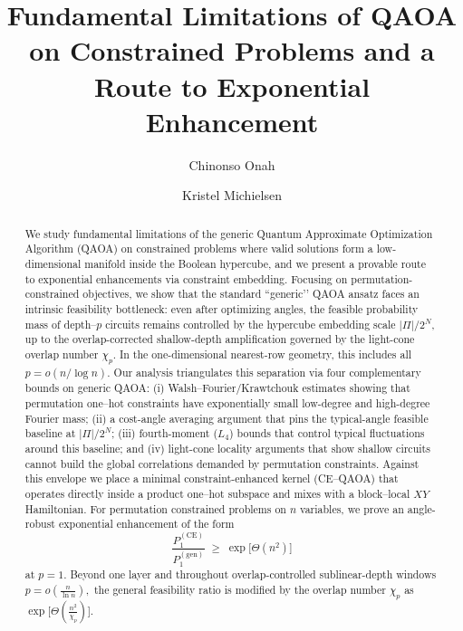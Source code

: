 \documentclass[a4paper,onecolumn,11pt,unpublished]{quantumarticle}
\author{Chinonso Onah}
\affiliation{Volkswagen AG, Berliner Ring 2, 38440 Wolfsburg, Germany}
\affiliation{Department of Physics, RWTH Aachen University, 52056 Aachen, Germany}
\author{Kristel Michielsen}
\affiliation{Forschungszentrum Jülich, Germany}
\affiliation{Universit\"at zu K\"oln, 50923 K\"oln, Germany}
\title{Fundamental Limitations of QAOA on Constrained Problems and a Route  to Exponential Enhancement}
\theoremstyle{remark}
\begin{document}
\maketitle




\begin{abstract}
We study fundamental limitations of the generic Quantum Approximate Optimization Algorithm (QAOA) on constrained problems where valid solutions form a low-dimensional manifold inside the Boolean hypercube, and we present a provable route to exponential enhancements via constraint embedding. Focusing on permutation-constrained objectives, we show that the standard “generic’’ QAOA ansatz faces an intrinsic feasibility bottleneck: even after optimizing angles, the feasible probability mass of depth--\(p\) circuits remains controlled by the hypercube embedding scale
\(|\Pi|/2^N\), up to the overlap-corrected shallow-depth amplification
governed by the light-cone overlap number \(\chi_p\). In the one-dimensional nearest-row geometry, this includes all \(p=o(n/\log n)\). Our analysis triangulates this separation via four complementary bounds on generic QAOA: (i) Walsh–Fourier/Krawtchouk estimates showing that permutation one–hot constraints have exponentially small low-degree and high-degree Fourier mass; (ii) a cost-angle averaging argument that pins the typical-angle feasible baseline at $|\Pi|/2^N$; (iii) fourth-moment ($L_4$) bounds that control typical fluctuations around this baseline; and (iv) light-cone locality arguments that show shallow circuits cannot build the global correlations demanded by permutation constraints. Against this envelope we place a minimal constraint-enhanced kernel (CE–QAOA) that operates directly inside a product one–hot subspace and mixes with a block–local $XY$ Hamiltonian.  For permutation constrained problems on \(n\) variables, we prove an
angle-robust exponential enhancement of the form
\begin{equation}
\label{eq:expp}
  \frac{P_{1}^{\mathrm{(CE)}}}{P_{1}^{\mathrm{(gen)}}}
  \;\ge\;
  \exp\!\bigl[\Theta(n^2)\bigr]
\end{equation}
at \(p=1\). Beyond one layer and throughout overlap-controlled sublinear-depth windows \(  p=o\!\left(\frac{n}{\ln n}\right),\) the general feasibility ratio is modified by the overlap number \(\chi_p\) as $\exp\!\bigl[\Theta(\frac{n^2}{\chi_p})\bigr]$.%
\end{abstract}
\end{document}
